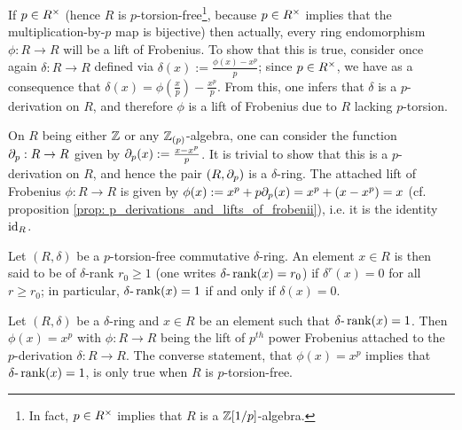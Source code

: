             \begin{remark}
                If $p \in R^{\x}$ (hence $R$ is $p$-torsion-free\footnote{In fact, $p \in R^{\x}$ implies that $R$ is a $\mathbb{Z}[1/p]$-algebra.}, because $p \in R^{\x}$ implies that the multiplication-by-$p$ map is bijective) then actually, every ring endomorphism $\phi: R \to R$ will be a lift of Frobenius. To show that this is true, consider once again $\delta: R \to R$ defined via $\delta(x) := \frac{\phi(x) - x^p}{p}$; since $p \in R^{\x}$, we have as a consequence that $\delta(x) = \phi\left(\frac{x}{p}\right) - \frac{x^p}{p}$. From this, one infers that $\delta$ is a $p$-derivation on $R$, and therefore $\phi$ is a lift of Frobenius due to $R$ lacking $p$-torsion.
            \end{remark}
            \begin{example}
                On $R$ being either $\mathbb{Z}$ or any $\mathbb{Z}_{(p)}$-algebra, one can consider the function $\partial_p: R \to R$ given by $\partial_p(x) := \frac{x - x^p}{p}$. It is trivial to show that this is a $p$-derivation on $R$, and hence the pair $(R, \partial_p)$ is a $\delta$-ring. The attached lift of Frobenius $\phi: R \to R$ is given by $\phi(x) := x^p + p\partial_p(x) = x^p + (x - x^p) = x$ (cf. proposition \ref{prop: p_derivations_and_lifts_of_frobenii}), i.e. it is the identity $\mathrm{id}_R$.
            \end{example}
            \begin{definition} \label{def: delta_rank}
                Let $(R, \delta)$ be a $p$-torsion-free commutative $\delta$-ring. An element $x \in R$ is then said to be of $\delta$-rank $r_0 \geq 1$ (one writes $\delta\text{-}\operatorname{rank}(x) = r_0$) if $\delta^r(x) = 0$ for all $r \geq r_0$; in particular, $\delta\text{-}\operatorname{rank}(x) = 1$ if and only if $\delta(x) = 0$.
            \end{definition}
            \begin{proposition}
                Let $(R, \delta)$ be a $\delta$-ring and $x \in R$ be an element such that $\delta\text{-}\operatorname{rank}(x) = 1$. Then $\phi(x) = x^p$ with $\phi: R \to R$ being the lift of $p^{th}$ power Frobenius attached to the $p$-derivation $\delta: R \to R$. The converse statement, that $\phi(x) = x^p$ implies that $\delta\text{-}\operatorname{rank}(x) = 1$, is only true when $R$ is $p$-torsion-free.
            \end{proposition}

